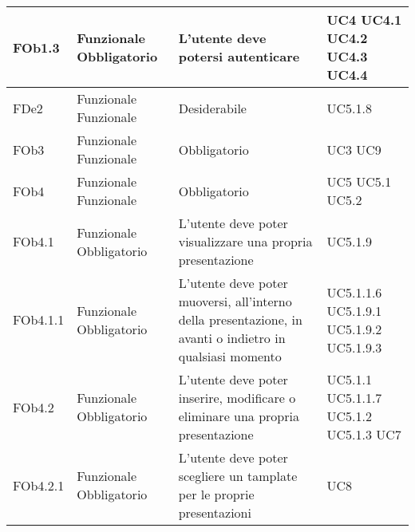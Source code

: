\begin{longtable}{|l|p{2.5cm}|p{2cm}|l|}
\hline
FOb1.3 & Funzionale \linebreak Obbligatorio & L'utente deve potersi autenticare & UC4 \linebreak  UC4.1 \linebreak  UC4.2 \linebreak  UC4.3 \linebreak  UC4.4 \linebreak  \\
\hline
FDe2 & Funzionale \linebreak Funzionale & Desiderabile & UC5.1.8 \linebreak \\
\hline
FOb3 & Funzionale \linebreak Funzionale & Obbligatorio & UC3 \linebreak UC9 \linebreak \\
\hline
FOb4 & Funzionale \linebreak Funzionale & Obbligatorio & UC5 \linebreak UC5.1 \linebreak UC5.2 \linebreak \\
\hline
FOb4.1 & Funzionale \linebreak Obbligatorio & L'utente deve poter visualizzare una propria presentazione & UC5.1.9 \linebreak  \\
\hline
FOb4.1.1 & Funzionale \linebreak Obbligatorio & L'utente deve poter muoversi, all'interno della presentazione, in avanti o indietro in qualsiasi momento & UC5.1.1.6 \linebreak  UC5.1.9.1 \linebreak  UC5.1.9.2 \linebreak  UC5.1.9.3 \linebreak  \\
\hline
FOb4.2 & Funzionale \linebreak Obbligatorio & L'utente deve poter inserire, modificare o eliminare una propria presentazione & UC5.1.1 \linebreak  UC5.1.1.7 \linebreak  UC5.1.2 \linebreak  UC5.1.3 \linebreak  UC7 \linebreak  \\
\hline
FOb4.2.1 & Funzionale \linebreak Obbligatorio & L'utente deve poter scegliere un tamplate per le proprie presentazioni & UC8 \linebreak  \\

\end{longtable}

